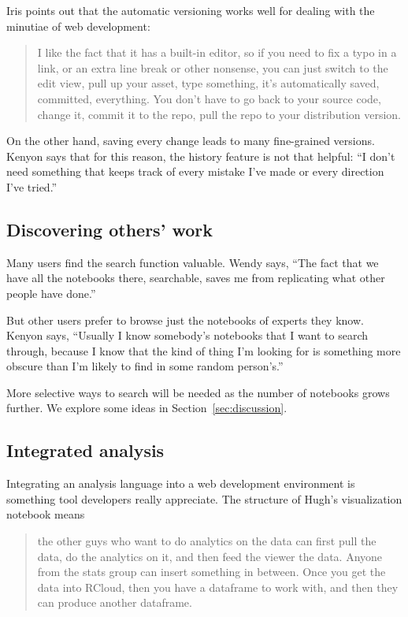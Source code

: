 
Iris points out that the automatic versioning works well for dealing with the
minutiae of web development:
\begin{quote}
I like the fact that it has a built-in editor, so
if you need to fix a typo in a link, or an extra line break or other
nonsense, you can just switch to the edit view, pull up your asset, type
something, it's automatically saved, committed, everything. You don't have to go
back to your source code, change it, commit it to the repo, pull the repo to
your distribution version. 
\end{quote}

On the other hand, saving every change leads to many fine-grained
versions. Kenyon says that for this reason, the history feature is not that
helpful: ``I don't need something that keeps track of every mistake I've made or
every direction I've tried.''


\subsection{Discovering others' work}
Many users find the search function valuable. Wendy says, ``The fact that we have
all the notebooks there, searchable, saves me from replicating what other people
have done.''

But other users prefer to browse just the notebooks of experts they
know. Kenyon says, ``Usually I know somebody's notebooks that I want to search
through, because I know that the kind of thing I'm looking for is something
more obscure than I'm likely to find in some random person's.''

More selective ways to search will be needed as the number of notebooks
grows further. We explore some ideas in Section~\ref{sec:discussion}.

\subsection{Integrated analysis}
Integrating an analysis language into a web development environment is something
tool developers really appreciate.  The structure of Hugh's visualization
notebook means
\begin{quote}
the other guys who want to do analytics on the data can first pull
the data, do the analytics on it, and then feed the viewer the data.
Anyone from the stats group can insert something in between.
Once you get the data into RCloud, then you have a dataframe
to work with, and then they can produce another dataframe.
\end{quote}

